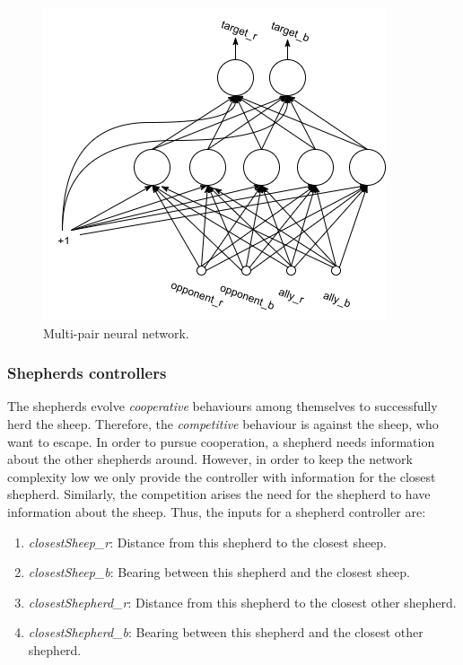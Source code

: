 \documentclass[conference]{IEEEtran}
\begin{document}
\begin{figure}[t]
	\centering
	\includegraphics[width=0.8\hsize]{imgs/nn-design_multi.png}
	\caption{Multi-pair neural network.}
	\label{fig:multi_pair_topology}
\end{figure}

\vspace{0.5em}
\subsubsection{Shepherds controllers}
The shepherds evolve \textit{cooperative} behaviours among themselves to successfully herd the sheep.
Therefore, the \textit{competitive} behaviour is against the sheep, who want to escape. 
In order to pursue cooperation, a shepherd needs information about the other shepherds around. 
However, in order to keep the network complexity low we only provide the controller with information for the closest shepherd. 
Similarly, the competition arises the need for the shepherd to have information about the sheep.
Thus, the inputs for a shepherd controller are: 

\begin{enumerate}
	\item \textit{closestSheep\_r}: Distance from this shepherd to the closest sheep.
	\item \textit{closestSheep\_b}: Bearing between this shepherd and the closest sheep. 
	\item \textit{closestShepherd\_r}: Distance from this shepherd to the closest other shepherd.
	\item \textit{closestShepherd\_b}: Bearing between this shepherd and the closest other shepherd.
\end{enumerate}
\end{document}
